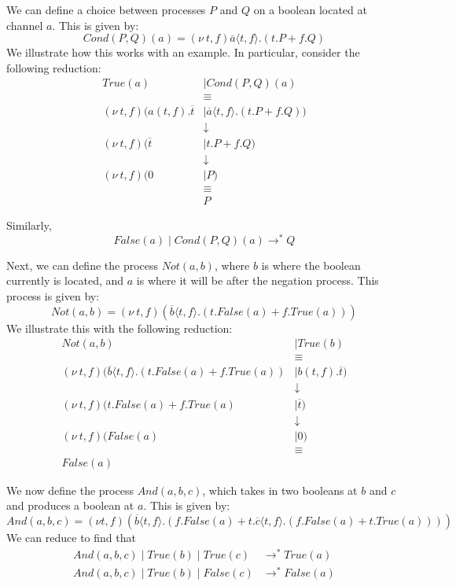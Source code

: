 \documentclass[a4paper, openany]{memoir}
\theoremstyle{definition}
\begin{document}
    We can define a choice between processes $P$ and $Q$ on a boolean located at channel $a$. This is given by:
    \[\textit{Cond}(P, Q)(a) = (\nu \ t, f)\overline{a} \langle t, f \rangle.(t.P + f.Q)\]
    We illustrate how this works with an example. In particular, consider the following reduction:
    \begin{align*}
        \textit{True}(a) &\mid \textit{Cond}(P, Q)(a) \\
        &\equiv \\
        (\nu \ t, f) (a(t, f).\overline{t} &\mid \overline{a} \langle t, f \rangle.(t.P + f.Q)) \\
        &\downarrow \\
        (\nu \ t, f) (\overline{t} &\mid t.P + f.Q) \\
        &\downarrow \\
        (\nu \ t, f) (0 &\mid P) \\
        &\equiv \\
        &P
    \end{align*}

    Similarly,
    \[\textit{False}(a) \mid \textit{Cond}(P, Q)(a) \to^* Q\]

    Next, we can define the process $\textit{Not}(a, b)$, where $b$ is where the boolean currently is located, and $a$ is where it will be after the negation process. This process is given by:
    \[\textit{Not}(a, b) = (\nu \ t, f)(\overline{b} \langle t, f \rangle.(
        t.\textit{False}(a) + f.\textit{True}(a)
    ))\]
    We illustrate this with the following reduction:
    \begin{align*}
        \textit{Not}(a, b) &\mid \textit{True}(b) \\
        &\equiv \\
        (\nu \ t, f)(\overline{b} \langle t, f \rangle.(t.\textit{False}(a) + f.\textit{True}(a)) &\mid b(t, f).\overline{t}) \\
        &\downarrow \\
        (\nu \ t, f)(t.\textit{False}(a) + f.\textit{True}(a) &\mid \overline{t} ) \\
        &\downarrow \\
        (\nu \ t, f)(\textit{False}(a) &\mid 0) \\
        &\equiv \\
        \textit{False}(a)
    \end{align*}

    We now define the process $\textit{And}(a, b, c)$, which takes in two booleans at $b$ and $c$ and produces a boolean at $a$. This is given by:
    \[\textit{And}(a, b, c) = (\nu t, f)(\overline{b} \langle t, f \rangle.(
        f.\textit{False}(a) + t.\overline{c} \langle t, f \rangle.(
            f.\textit{False}(a) + t.\textit{True}(a)
        )
    ))\]
    We can reduce to find that
    \begin{align*}
        \textit{And}(a, b, c) \mid \textit{True}(b) \mid \textit{True}(c) &\to^* \textit{True}(a) \\
        \textit{And}(a, b, c) \mid \textit{True}(b) \mid \textit{False}(c) &\to^* \textit{False}(a)
    \end{align*}
\end{document}
